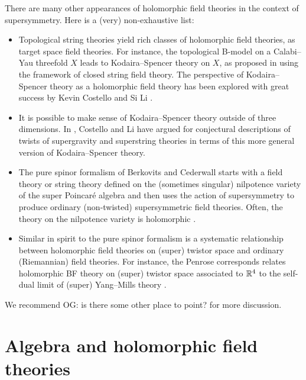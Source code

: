 \documentclass[11pt]{amsart}
\def\owen#1{{\textcolor{violet!50!black}{OG: {#1}}}}
\begin{document}
There are many other appearances of holomorphic field theories in the context of supersymmetry.
Here is a (very) non-exhaustive list:
\begin{itemize}
\item Topological string theories yield rich classes of holomorphic field theories, as target space field theories. 
For instance, the topological B-model on a Calabi--Yau threefold $X$ leads to Kodaira--Spencer theory on $X$, as proposed in \cite{BCOV} using the framework of closed string field theory. 
The perspective of Kodaira--Spencer theory as a holomorphic field theory has been explored with great success by Kevin Costello and Si Li \cite{CL1, CL2, CL3}.
\item
It is possible to make sense of Kodaira--Spencer theory outside of three dimensions.
In \cite{CLsugra}, Costello and Li have argued for conjectural descriptions of twists of supergravity and superstring theories in terms of this more general version of Kodaira--Spencer theory.
\item The pure spinor formalism of Berkovits and Cederwall  \cite{Cederwall, Berkovits} starts with a field theory or string theory defined on the (sometimes singular) nilpotence variety of the super Poincar\'e algebra and then uses the action of supersymmetry to produce ordinary (non-twisted) supersymmetric field theories. 
Often, the theory on the nilpotence variety is holomorphic \cite{ESW,SWpure}. 
\item Similar in spirit to the pure spinor formalism is a systematic relationship between holomorphic field theories on (super) twistor space and ordinary (Riemannian) field theories.
For instance, the Penrose corresponds relates holomorphic BF theory on (super) twistor space associated to $\mathbb R^4$ to the self-dual limit of (super) Yang--Mills theory \cite{Penrose, Kevins work..., other twistor literature}.
\end{itemize}
We recommend \owen{is there some other place to point?} for more discussion.

\section{Algebra and holomorphic field theories}
\label{sec: algebra}
\end{document}
